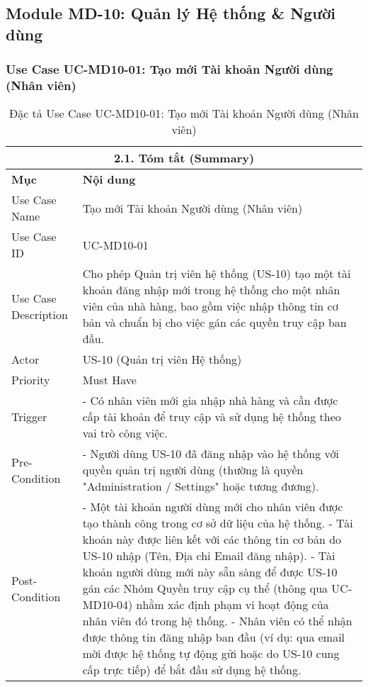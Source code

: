 \subsection{Module MD-10: Quản lý Hệ thống \& Người dùng}

\subsubsection{Use Case UC-MD10-01: Tạo mới Tài khoản Người dùng (Nhân viên)}
\begin{longtable}{|m{4cm}|p{11cm}|}
\caption{Đặc tả Use Case UC-MD10-01: Tạo mới Tài khoản Người dùng (Nhân viên)} \label{tab:uc_md10_01_full_v2_latex_fixed_in_codeblock} \\
\hline
\multicolumn{2}{|c|}{\textbf{2.1. Tóm tắt (Summary)}} \\
\hline
\textbf{Mục} & \textbf{Nội dung} \\
\hline
\endhead %
\midrule
\endfoot %
\bottomrule
\endlastfoot %
Use Case Name & Tạo mới Tài khoản Người dùng (Nhân viên) \\
\hline
Use Case ID & UC-MD10-01 \\
\hline
Use Case Description & Cho phép Quản trị viên hệ thống (US-10) tạo một tài khoản đăng nhập mới trong hệ thống cho một nhân viên của nhà hàng, bao gồm việc nhập thông tin cơ bản và chuẩn bị cho việc gán các quyền truy cập ban đầu. \\
\hline
Actor & US-10 (Quản trị viên Hệ thống) \\
\hline
Priority & Must Have \\
\hline
Trigger & - Có nhân viên mới gia nhập nhà hàng và cần được cấp tài khoản để truy cập và sử dụng hệ thống theo vai trò công việc. \\
\hline
Pre-Condition & - Người dùng US-10 đã đăng nhập vào hệ thống với quyền quản trị người dùng (thường là quyền "Administration / Settings" hoặc tương đương). \\
\hline
Post-Condition & - Một tài khoản người dùng mới cho nhân viên được tạo thành công trong cơ sở dữ liệu của hệ thống. \newline - Tài khoản này được liên kết với các thông tin cơ bản do US-10 nhập (Tên, Địa chỉ Email đăng nhập). \newline - Tài khoản người dùng mới này sẵn sàng để được US-10 gán các Nhóm Quyền truy cập cụ thể (thông qua UC-MD10-04) nhằm xác định phạm vi hoạt động của nhân viên đó trong hệ thống. \newline - Nhân viên có thể nhận được thông tin đăng nhập ban đầu (ví dụ: qua email mời được hệ thống tự động gửi hoặc do US-10 cung cấp trực tiếp) để bắt đầu sử dụng hệ thống. \\

\end{longtable}
